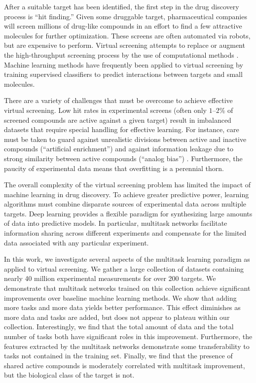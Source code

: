 After a suitable target has been identified, the first step in the drug
discovery process is ``hit finding.'' Given some druggable target,
pharmaceutical companies will screen millions of drug-like compounds in an
effort to find a few attractive molecules for further optimization. These
screens are often automated via robots, but are expensive to perform.
Virtual screening attempts to replace or augment the high-throughput
screening process by the use of computational methods
\cite{shoichet2004virtual}. Machine learning methods have frequently been
applied to virtual screening by training supervised classifiers to predict
interactions between targets and small molecules.

There are a variety of challenges that must be overcome to achieve
effective virtual screening. Low hit rates in experimental screens (often
only $1$--$2$\% of screened compounds are active against a given target)
result in imbalanced datasets that require special handling for effective
learning. For instance, care must be taken to guard against unrealistic
divisions between active and inactive compounds (``artificial enrichment'')
and against information leakage due to strong similarity between active
compounds (``analog bias'') \cite{rohrer2009maximum}.  Furthermore, the
paucity of experimental data means that overfitting is a perennial thorn.

The overall complexity of the virtual screening problem has limited the
impact of machine learning in drug discovery. To achieve greater predictive
power, learning algorithms must combine disparate sources of experimental
data across multiple targets. Deep learning provides a flexible paradigm
for synthesizing large amounts of data into predictive models. In
particular, multitask networks facilitate information sharing across
different experiments and compensate for the limited data associated with
any particular experiment.

In this work, we investigate several aspects of the multitask learning
paradigm as applied to virtual screening. We gather a large collection of
datasets containing nearly 40 million experimental measurements for over
200 targets. We demonstrate that multitask networks trained on this
collection achieve significant improvements over baseline machine learning
methods. We show that adding more tasks and more data yields better
performance. This effect diminishes as more data and tasks are added, but
does not appear to plateau within our collection. Interestingly, we find
that the total amount of data and the total number of tasks both have
significant roles in this improvement. Furthermore, the features extracted
by the multitask networks demonstrate some transferability to tasks not
contained in the training set. Finally, we find that the presence of shared
active compounds is moderately correlated with multitask improvement, but
the biological class of the target is not.

